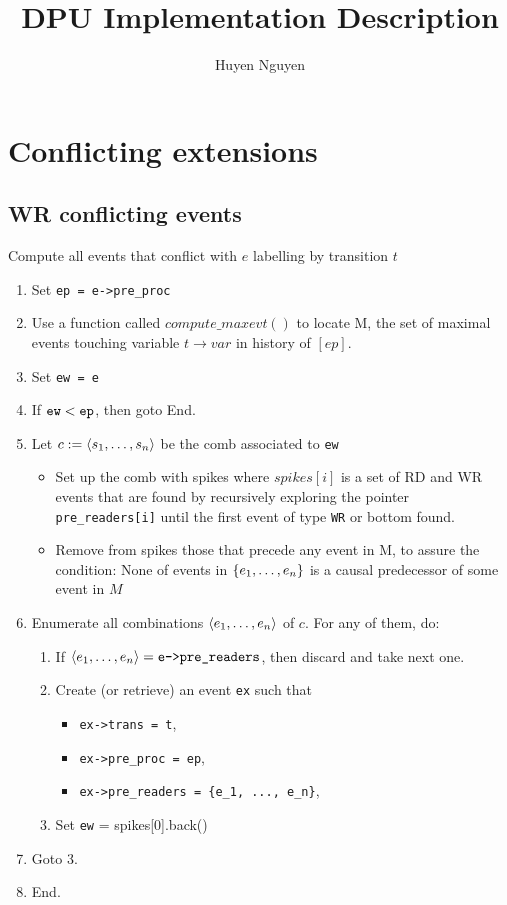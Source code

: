 \documentclass{llncs}
\title{DPU Implementation Description}
\author{Huyen Nguyen}
\institute{Université Paris 13, Sorbonne Paris Cité, LIPN, CNRS, France}
\begin{document}
\maketitle
\noindent
\section{Conflicting extensions}
\subsection{WR conflicting events}
Compute all events that conflict with $e$ labelling by transition $t$
\begin{enumerate}
\item Set \verb!ep = e->pre_proc!
\item
	Use a function called $compute\_maxevt()$ to locate M, the set of maximal events touching variable $t \rightarrow var$ in
	history of $[ep]$. 
\item Set \verb!ew = e!
\item If $\verb!ew! < \verb!ep!$, then goto End.
\item Let $c \mathrel{:=} \langle s_1, \ldots, s_n\rangle$ be the comb associated to \verb!ew!
	\begin{itemize}
	\item
		Set up the comb with spikes where $spikes[i]$ is a set of RD and WR events that are found by recursively exploring the
		pointer \verb!pre_readers[i]! until the first event of type \verb!WR! or bottom found.
	\item
		Remove from spikes those that precede any event in M, to assure the condition: None of events in ${\{ e_1, \ldots, e_n \mathclose \}}	
		$ is a causal predecessor of some event in $M$
\end{itemize}
\item
  Enumerate all combinations $\langle e_1, \ldots, e_n\rangle$ of $c$.
  For any of them, do:
  \begin{enumerate}
  \item
    If $\tup{e_1, \ldots, e_n} = \verb!e->pre_readers!$, then discard and take
    next one.
  \item
    Create (or retrieve) an event \verb!ex! such that
    \begin{itemize}
    \item \verb!ex->trans = t!,
    \item \verb!ex->pre_proc = ep!,
    \item \verb!ex->pre_readers = {e_1, ..., e_n}!,
    \end{itemize}
  \item
    Set \verb!ew! = spikes[0].back() 
  \end{enumerate}
\item Goto 3.
\item End.
\end{enumerate}
\end{document}
